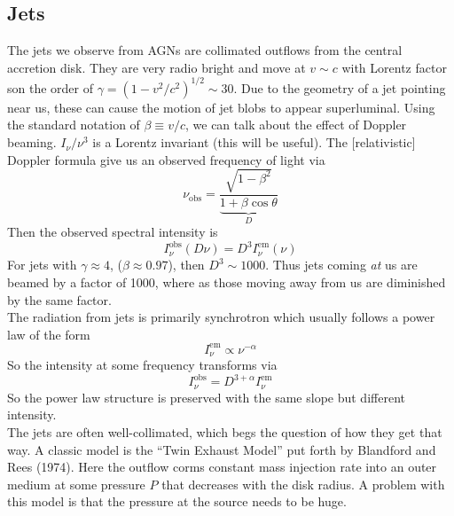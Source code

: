 \documentclass[10pt]{article}
\numberwithin{equation}{section}
\newcommand{\n}{\noindent}
\begin{document}
	\subsection{Jets} %
	\label{sub:jets}
	The jets we observe from AGNs are collimated outflows from the central accretion disk. They are very radio bright and move at $v\sim c$ with Lorentz factor son the order of $\gamma = (1-v^2/c^2)^{1/2}\sim 30$. Due to the geometry of a jet pointing near us, these can cause the motion of jet blobs to appear superluminal. Using the standard notation of $\beta\equiv v/c$, we can talk about the effect of Doppler beaming. $I_\nu/\nu^3$ is a Lorentz invariant (this will be useful). The [relativistic] Doppler formula give us an observed frequency of light via
	\begin{equation}
		\label{eq:jets:1} \nu_{\mathrm{obs}} = \frac{\sqrt{1-\beta^2}}{\underbrace{1+\beta\cos\theta}_D}
	\end{equation}
	Then the observed spectral intensity is
	\begin{equation}
		\label{eq:jets:2} I_\nu^{\mathrm{obs}} (D\nu) = D^3 I_\nu^{\mathrm{em}}(\nu)
	\end{equation}
	For jets with $\gamma \approx 4$, ($\beta \approx 0.97$), then $D^3\sim 1000$. Thus jets coming \emph{at} us are beamed by a factor of 1000, where as those moving away from us are diminished by the same factor.\\
	
	\n The radiation from jets is primarily synchrotron which usually follows a power law of the form
	\begin{equation}
		\label{eq:jets:3} I_\nu^{\mathrm{em}} \propto \nu^{-\alpha}
	\end{equation}
	So the intensity at some frequency transforms via
	\begin{equation}
		\label{eq:jets:4} I_{\nu}^{\mathrm{obs}}=D^{3+\alpha}I_\nu^{\mathrm{em}}
	\end{equation}
	So the power law structure is preserved with the same slope but different intensity.\\
	
	\n The jets are often well-collimated, which begs the question of how they get that way. A classic model is the ``Twin Exhaust Model'' put forth by Blandford and Rees (1974). Here the outflow corms constant mass injection rate into an outer medium at some pressure $P$ that decreases with the disk radius. A problem with this model is that the pressure at the source needs to be huge. \\
	
\end{document}
